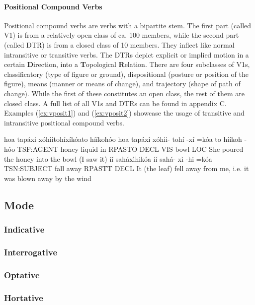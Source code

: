 \documentclass[a4paper, 12pt, oneside]{memoir}
\begin{document}
\paragraph{Positional Compound Verbs}
Positional compound verbs are verbs with a bipartite stem. The first part (called V1) is from a relatively open class of ca. 100 members, while the second part (called DTR) is from a closed class of 10 members. They inflect like normal intransitive or transitive verbs. The DTRs depict explicit or implied motion in a certain \textbf{D}irection, into a \textbf{T}opological \textbf{R}elation. There are four subclasses of V1s, classificatory (type of figure or ground), dispositional (posture or position of the figure), means (manner or means of change), and trajectory (shape of path of change). While the first of these constitutes an open class, the rest of them are closed class. A full list of all V1s and DTRs can be found in appendix C. Examples (\ref{ex:vposit1}) and (\ref{ex:vposit2}) showcase the usage of transitive and intransitive positional compound verbs.
\begin{examples}
\newbaarucmd{\cl}{\baarujuncture{\texttt{==}}}
    \ex \label{ex:vposit1}
    \words hoa tapáxi xóhiitohíxíkóato hííkohóo
    \bits hoa tapáxi xóhii- tohí -xí =kóa \cl to hííkoh -hóo
    \gloss TSF:AGENT honey liquid in RPASTO DECL VIS bowl LOC
    \tr She poured the honey into the bowl (I saw it)
    \ex \label{ex:vposit2}
    \words íí saháxìhikóa
    \bits íí sahá- xì -hi =kóa 
    \gloss TSN:SUBJECT fall away RPASTT DECL
    \tr It (the leaf) fell away from me, i.e. it was blown away by the wind
\end{examples}

\subsection{Mode}\label{svmode}
\subsubsection{Indicative}
\subsubsection{Interrogative}
\subsubsection{Optative}
\subsubsection{Hortative}
\end{document}

